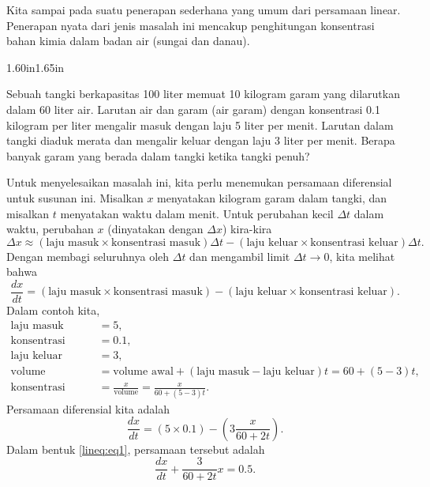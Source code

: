 \begin{example}
Kita sampai pada suatu penerapan sederhana
yang umum dari persamaan linear.
Penerapan nyata dari jenis masalah ini mencakup
penghitungan konsentrasi
bahan kimia dalam badan air (sungai dan danau).

\begin{mywrapfigsimp}{1.60in}{1.65in}
\noindent
{}
\end{mywrapfigsimp}
Sebuah tangki berkapasitas 100 liter memuat 10 kilogram garam yang dilarutkan dalam 60 liter
air. Larutan air dan garam (air garam) dengan konsentrasi 0.1
kilogram per
liter mengalir masuk dengan laju 5 liter per menit. Larutan
dalam tangki diaduk merata dan mengalir keluar dengan laju 3 liter per menit.
Berapa banyak garam yang berada dalam tangki ketika tangki penuh?

Untuk menyelesaikan masalah ini, kita perlu menemukan persamaan diferensial
untuk susunan ini.
Misalkan $x$ menyatakan kilogram garam dalam tangki, dan
misalkan $t$ menyatakan waktu dalam menit. Untuk perubahan kecil $\Delta t$ dalam
waktu, perubahan $x$ (dinyatakan dengan $\Delta x$) kira-kira
\begin{equation*}
\Delta x \approx
(\text{laju masuk} \times \text{konsentrasi masuk}) \Delta t -
(\text{laju keluar} \times \text{konsentrasi keluar}) \Delta t .
\end{equation*}
Dengan membagi seluruhnya oleh $\Delta t$ dan
mengambil limit $\Delta t \to 0$, kita melihat bahwa
\begin{equation*}
\frac{dx}{dt} =
(\text{laju masuk} \times \text{konsentrasi masuk}) -
(\text{laju keluar} \times \text{konsentrasi keluar}) .
\end{equation*}
Dalam contoh kita,
\begin{equation*}
\begin{aligned}
\text{laju masuk} &= 5 , \\
\text{konsentrasi masuk} &= 0.1 , \\
\text{laju keluar} &= 3 , \\
\text{volume} &= \text{volume awal} + (\text{laju masuk} - \text{laju keluar})t
= 60+(5-3)t, \\
\text{konsentrasi keluar} &= \frac{x}{\text{volume}} = \frac{x}{60+(5-3)t} .
\end{aligned}
\end{equation*}
Persamaan diferensial kita adalah
\begin{equation*}
\frac{dx}{dt} =
(5 \times 0.1) -
\left(3 \frac{x}{60+2t}\right) .
\end{equation*}
Dalam bentuk \eqref{lineq:eq1}, persamaan tersebut adalah
\begin{equation*}
\frac{dx}{dt} +
\frac{3}{60+2t} x
=
0.5 .
\end{equation*}


\end{example}

